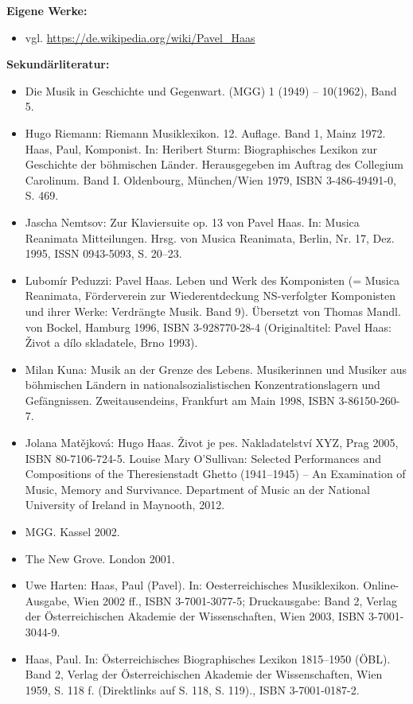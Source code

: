 \documentclass[a4paper]{article}
\begin{document}
\bigskip

\textbf{Eigene Werke:}

\begin{itemize}
\item vgl. \url{https://de.wikipedia.org/wiki/Pavel_Haas} 
\end{itemize}

\bigskip

\textbf{Sekundärliteratur:}

\begin{itemize}
\item Die Musik in Geschichte und Gegenwart. (MGG) 1 (1949) – 10(1962), Band 5.  
\item Hugo Riemann: Riemann Musiklexikon. 12. Auflage. Band 1, Mainz 1972.  Haas, Paul, Komponist. In: Heribert Sturm:
Biographisches Lexikon zur Geschichte der böhmischen Länder. Herausgegeben im Auftrag des Collegium Carolinum. Band I.
Oldenbourg, München/Wien 1979, ISBN 3-486-49491-0, S. 469.  
\item Jascha Nemtsov: Zur Klaviersuite op. 13 von Pavel Haas. In: Musica Reanimata Mitteilungen. Hrsg. von Musica
Reanimata, Berlin, Nr. 17, Dez. 1995, ISSN 0943-5093, S. 20–23.  
\item Lubomír Peduzzi: Pavel Haas. Leben und Werk des Komponisten (= Musica Reanimata, Förderverein zur Wiederentdeckung
NS-verfolgter Komponisten und ihrer Werke: Verdrängte Musik. Band 9). Übersetzt von Thomas Mandl. von Bockel, Hamburg
1996, ISBN 3-928770-28-4 (Originaltitel: Pavel Haas: Život a dílo skladatele, Brno 1993).  
\item Milan Kuna: Musik an der Grenze des Lebens. Musikerinnen und Musiker aus böhmischen Ländern in
nationalsozialistischen Konzentrationslagern und Gefängnissen. Zweitausendeins, Frankfurt am Main 1998, ISBN
3-86150-260-7.  
\item Jolana Matějková: Hugo Haas. Život je pes. Nakladatelství XYZ, Prag 2005, ISBN 80-7106-724-5.  Louise Mary
O’Sullivan: Selected Performances and Compositions of the Theresienstadt Ghetto (1941–1945) – An Examination of Music,
Memory and Survivance. Department of Music an der National University of Ireland in Maynooth, 2012.  
\item MGG. Kassel 2002.  
\item The New Grove. London 2001.  
\item Uwe Harten: Haas, Paul (Pavel). In: Oesterreichisches Musiklexikon. Online-Ausgabe, Wien 2002 ff., ISBN
3-7001-3077-5; Druckausgabe: Band 2, Verlag der Österreichischen Akademie der Wissenschaften, Wien 2003, ISBN
3-7001-3044-9.  
\item Haas, Paul. In: Österreichisches Biographisches Lexikon 1815–1950 (ÖBL). Band 2, Verlag der Österreichischen
Akademie der Wissenschaften, Wien 1959, S. 118 f. (Direktlinks auf S. 118, S. 119)., ISBN 3-7001-0187-2.
\end{itemize}
\end{document}
